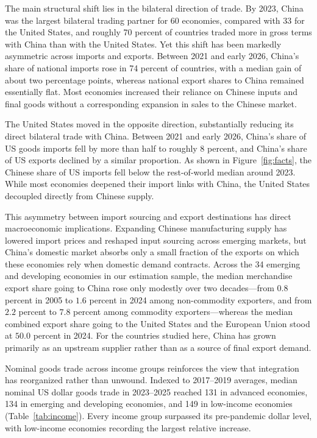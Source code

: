\documentclass[12pt, a4paper]{article}
\begin{document}
The main structural shift lies in the bilateral direction of trade. By 2023, China was the largest bilateral trading partner for 60 economies, compared with 33 for the United States, and roughly 70 percent of countries traded more in gross terms with China than with the United States. Yet this shift has been markedly asymmetric across imports and exports. Between 2021 and early 2026, China's share of national imports rose in 74 percent of countries, with a median gain of about two percentage points, whereas national export shares to China remained essentially flat. Most economies increased their reliance on Chinese inputs and final goods without a corresponding expansion in sales to the Chinese market.

The United States moved in the opposite direction, substantially reducing its direct bilateral trade with China. Between 2021 and early 2026, China's share of US goods imports fell by more than half to roughly 8 percent, and China's share of US exports declined by a similar proportion. As shown in Figure~\ref{fig:facts}, the Chinese share of US imports fell below the rest-of-world median around 2023. While most economies deepened their import links with China, the United States decoupled directly from Chinese supply.

This asymmetry between import sourcing and export destinations has direct macroeconomic implications. Expanding Chinese manufacturing supply has lowered import prices and reshaped input sourcing across emerging markets, but China's domestic market absorbs only a small fraction of the exports on which these economies rely when domestic demand contracts. Across the 34 emerging and developing economies in our estimation sample, the median merchandise export share going to China rose only modestly over two decades---from $0.8$ percent in 2005 to $1.6$ percent in 2024 among non-commodity exporters, and from $2.2$ percent to $7.8$ percent among commodity exporters---whereas the median combined export share going to the United States and the European Union stood at $50.0$ percent in 2024. For the countries studied here, China has grown primarily as an upstream supplier rather than as a source of final export demand.



Nominal goods trade across income groups reinforces the view that integration has reorganized rather than unwound. Indexed to 2017--2019 averages, median nominal US dollar goods trade in 2023--2025 reached 131 in advanced economies, 134 in emerging and developing economies, and 149 in low-income economies (Table~\ref{tab:income}). Every income group surpassed its pre-pandemic dollar level, with low-income economies recording the largest relative increase.
\end{document}
